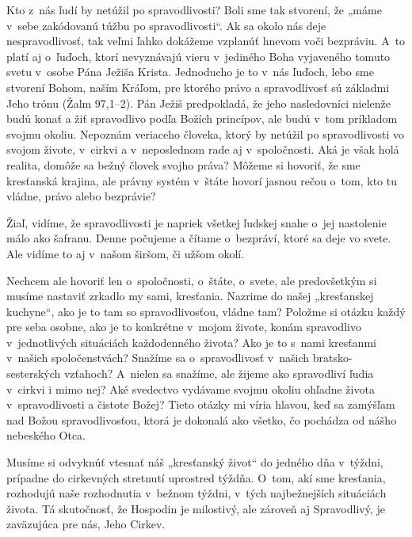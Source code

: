 \def\velkostpisma{10}
\def\velkostriadku{12.5}



Kto z~nás ľudí by netúžil po spravodlivosti? Boli sme tak stvorení, že „máme v~sebe zakódovanú túžbu po spravodlivosti“. Ak sa okolo nás deje nespravodlivosť, tak  veľmi ľahko dokážeme vzplanúť hnevom voči bezpráviu. A~to platí aj o~ľuďoch, ktorí nevyznávajú vieru v~jediného Boha vyjaveného tomuto svetu v~osobe Pána Ježiša Krista. Jednoducho je to v~nás ľuďoch, lebo sme stvorení Bohom, naším Kráľom, pre ktorého právo a spravodlivosť sú základmi Jeho trónu (Žalm 97,1--2). Pán Ježiš predpokladá, že jeho nasledovníci nielenže budú konať a žiť spravodlivo podľa Božích princípov, ale  budú v~tom príkladom svojmu okoliu. Nepoznám veriaceho človeka, ktorý by netúžil po spravodlivosti vo svojom živote, v~cirkvi a v~neposlednom rade aj v~spoločnosti. Aká je však holá realita, domôže sa bežný človek svojho práva? Môžeme si hovoriť, že sme kresťanská krajina, ale právny systém v~štáte hovorí jasnou rečou o~tom, kto tu vládne, právo alebo bezprávie?

Žiaľ, vidíme, že spravodlivosti je napriek všetkej ľudskej snahe o~jej nastolenie málo ako šafranu. Denne počujeme a čítame o~bezpráví, ktoré sa deje vo svete. Ale vidíme to aj v~našom širšom, či užšom okolí.

Nechcem ale hovoriť len o~spoločnosti, o~štáte, o~svete, ale predovšetkým si musíme nastaviť zrkadlo my sami, kresťania. Nazrime  do našej „kresťanskej kuchyne“, ako je to tam so spravodlivosťou, vládne tam? Položme si otázku každý pre seba osobne, ako je to konkrétne v~mojom živote, konám spravodlivo v~jednotlivých situáciách každodenného života? Ako je to s~nami kresťanmi v~našich spoločenstvách? Snažíme sa o~spravodlivosť v~našich bratsko-sesterských vzťahoch? A~nielen sa snažíme, ale žijeme ako spravodliví ľudia v~cirkvi i mimo nej? Aké svedectvo vydávame svojmu okoliu ohľadne života v~spravodlivosti a čistote Božej? Tieto otázky mi víria hlavou, keď sa zamýšľam nad Božou spravodlivosťou, ktorá je dokonalá ako všetko, čo pochádza od nášho nebeského Otca.

Musíme si odvyknúť vtesnať náš „kresťanský život“ do jedného dňa v~týždni, prípadne do cirkevných stretnutí uprostred týždňa. O~tom, akí sme kresťania, rozhodujú naše rozhodnutia v~bežnom týždni, v~tých najbežnejších situáciách života. Tá skutočnosť, že Hospodin je milostivý, ale zároveň aj Spravodlivý, je zaväzujúca pre nás, Jeho Cirkev.

